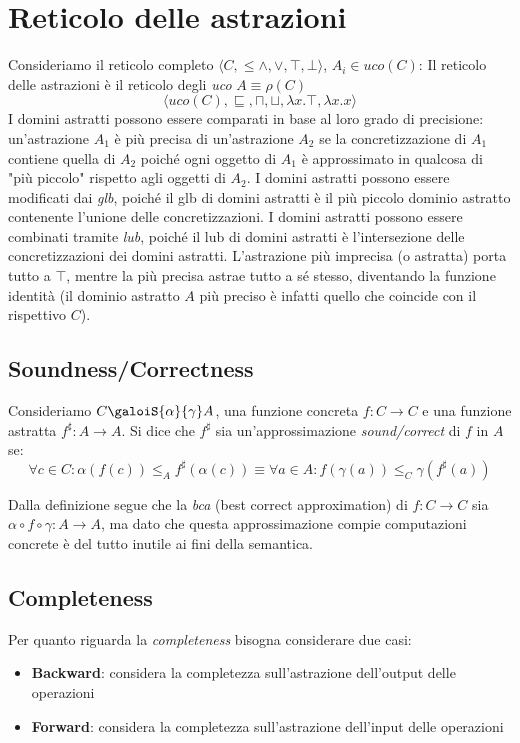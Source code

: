 \documentclass[a4paper,12pt,openany]{article}
\newenvironment{definition}[1][Definizione]{\begin{trivlist}
\item[\hskip \labelsep {\bfseries #1}]}{\end{trivlist}}
\begin{document}
\section{Reticolo delle astrazioni}
Consideriamo il reticolo completo $\langle C, \leq \land, \lor , \top, \bot \rangle$, $A_i \in uco(C)$:
\newline
Il reticolo delle astrazioni è il reticolo degli \emph{uco} $A \equiv \rho(C)$
$$\langle uco(C), \sqsubseteq, \sqcap, \sqcup, \lambda x.\top, \lambda x.x \rangle$$
I domini astratti possono essere comparati in base al loro grado di precisione: un'astrazione $A_1$ è più
precisa di un'astrazione $A_2$ se la concretizzazione di $A_1$ contiene quella di $A_2$ poiché ogni 
oggetto di $A_1$ è approssimato in qualcosa di "più piccolo" rispetto agli oggetti di $A_2$.
\newline
I domini astratti possono essere modificati dai \emph{glb}, poiché il glb di domini astratti è il più
piccolo dominio astratto contenente l'unione delle concretizzazioni.
\newline
I domini astratti possono essere combinati tramite \emph{lub}, poiché il lub di domini astratti è 
l'intersezione delle concretizzazioni dei domini astratti.
\newline
L'astrazione più imprecisa (o astratta) porta tutto a $\top$, mentre la più precisa astrae tutto a sé stesso,
diventando la funzione identità (il dominio astratto $A$ più preciso è infatti quello che coincide con il
rispettivo $C$).

\subsection{Soundness/Correctness}
\begin{definition}[Correctness]
    Consideriamo $C \galoiS{\alpha}{\gamma} A$, una funzione concreta $ f : C \to C$ e una funzione astratta
    $f^\sharp : A \to A$. Si dice che $f^\sharp$ sia un'approssimazione \emph{sound/correct} di $f$ in $A$ se:
    $$\forall c \in C: \alpha(f(c)) \leq_A f^\sharp(\alpha(c)) 
    \equiv 
    \forall a \in A: f(\gamma(a)) \leq_C \gamma(f^\sharp(a))$$
\end{definition}

Dalla definizione segue che la \emph{bca} (best correct approximation) di $f : C \to C$ sia 
$\alpha \circ f \circ \gamma : A \to A$, ma dato che questa approssimazione compie computazioni concrete
è del tutto inutile ai fini della semantica.

\subsection{Completeness}
Per quanto riguarda la \emph{completeness} bisogna considerare due casi:
\begin{itemize}
    \item \textbf{Backward}: considera la completezza sull'astrazione dell'output delle operazioni
    \item \textbf{Forward}: considera  la completezza sull'astrazione dell'input delle operazioni
\end{itemize}
\end{document}
